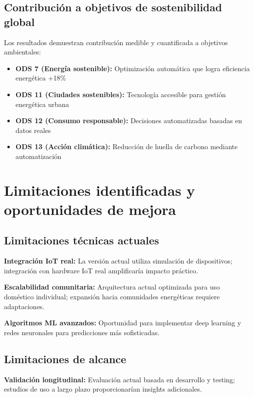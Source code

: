 \subsection{Contribución a objetivos de sostenibilidad global}

Los resultados demuestran contribución medible y cuantificada a objetivos ambientales:

\begin{itemize}
    \item \textbf{ODS 7 (Energía sostenible):} Optimización automática que logra eficiencia energética +18\%
    \item \textbf{ODS 11 (Ciudades sostenibles):} Tecnología accesible para gestión energética urbana
    \item \textbf{ODS 12 (Consumo responsable):} Decisiones automatizadas basadas en datos reales
    \item \textbf{ODS 13 (Acción climática):} Reducción de huella de carbono mediante automatización
\end{itemize}

\section{Limitaciones identificadas y oportunidades de mejora}

\subsection{Limitaciones técnicas actuales}

\textbf{Integración IoT real:} La versión actual utiliza simulación de dispositivos; integración con hardware IoT real amplificaría impacto práctico.

\textbf{Escalabilidad comunitaria:} Arquitectura actual optimizada para uso doméstico individual; expansión hacia comunidades energéticas requiere adaptaciones.

\textbf{Algoritmos ML avanzados:} Oportunidad para implementar deep learning y redes neuronales para predicciones más sofisticadas.

\subsection{Limitaciones de alcance}

\textbf{Validación longitudinal:} Evaluación actual basada en desarrollo y testing; estudios de uso a largo plazo proporcionarían insights adicionales.

